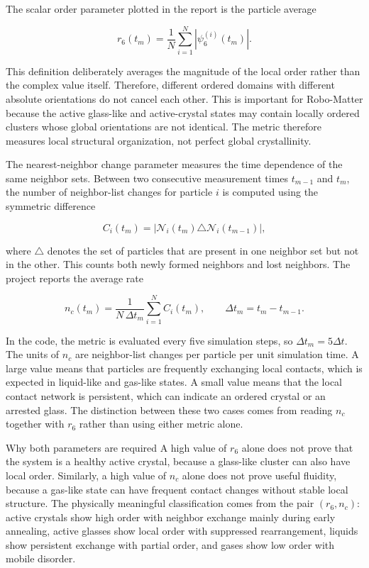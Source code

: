 \documentclass[12pt,a4paper,oneside]{report}
\begin{document}
The scalar order parameter plotted in the report is the particle average

\begin{equation}
r_6(t_m)=
\frac{1}{N}
\sum_{i=1}^{N}
\left|
\psi_6^{(i)}(t_m)
\right|.
\end{equation}

This definition deliberately averages the magnitude of the local order rather than the complex value itself. Therefore, different ordered domains with different absolute orientations do not cancel each other. This is important for Robo-Matter because the active glass-like and active-crystal states may contain locally ordered clusters whose global orientations are not identical. The metric therefore measures local structural organization, not perfect global crystallinity.

The nearest-neighbor change parameter measures the time dependence of the same neighbor sets. Between two consecutive measurement times $t_{m-1}$ and $t_m$, the number of neighbor-list changes for particle $i$ is computed using the symmetric difference

\begin{equation}
C_i(t_m)=
\left|
\mathcal{N}_i(t_m)
\triangle
\mathcal{N}_i(t_{m-1})
\right|,
\end{equation}

where $\triangle$ denotes the set of particles that are present in one neighbor set but not in the other. This counts both newly formed neighbors and lost neighbors. The project reports the average rate

\begin{equation}
n_c(t_m)=
\frac{1}{N\,\Delta t_m}
\sum_{i=1}^{N}
C_i(t_m),
\qquad
\Delta t_m=t_m-t_{m-1}.
\end{equation}

In the code, the metric is evaluated every five simulation steps, so $\Delta t_m=5\Delta t$. The units of $n_c$ are neighbor-list changes per particle per unit simulation time. A large value means that particles are frequently exchanging local contacts, which is expected in liquid-like and gas-like states. A small value means that the local contact network is persistent, which can indicate an ordered crystal or an arrested glass. The distinction between these two cases comes from reading $n_c$ together with $r_6$ rather than using either metric alone.

\begin{resultbox}{Why both parameters are required}
A high value of $r_6$ alone does not prove that the system is a healthy active crystal, because a glass-like cluster can also have local order. Similarly, a high value of $n_c$ alone does not prove useful fluidity, because a gas-like state can have frequent contact changes without stable local structure. The physically meaningful classification comes from the pair $(r_6,n_c)$: active crystals show high order with neighbor exchange mainly during early annealing, active glasses show local order with suppressed rearrangement, liquids show persistent exchange with partial order, and gases show low order with mobile disorder.
\end{resultbox}
\end{document}
